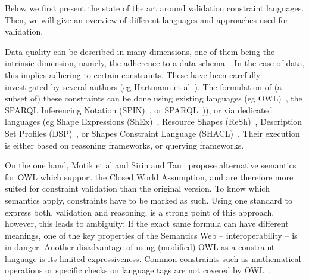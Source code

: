 Below
we first present the state of the art around validation constraint languages.
Then, we will give an overview
of different languages and approaches used for \rdf validation.


Data quality can be described in many dimensions,
one of them being the intrinsic dimension, namely,
the adherence to a data schema~\cite{zaveri2015quality}.
In the case of \rdf data, this implies adhering to certain constraints.
These have been carefully investigated by several authors (eg Hartmann et al~\cite{hartmann2016}).
The formulation of (a subset of) these constraints can be done using existing languages (eg OWL)~\cite{owl}, 
the SPARQL Inferencing Notation (SPIN)~\cite{Knublauch2011}, or SPARQL~\cite{sparql})),
or via dedicated languages
(eg Shape Expressions (ShEx)~\cite{shex}, Resource Shapes (ReSh)~\cite{resh}, Description Set Profiles (DSP)~\cite{dsp}, 
or Shapes Constraint Language (SHACL)~\cite{shacl}.
Their execution is either based on reasoning frameworks, or querying frameworks.

On the one hand, Motik et al \cite{motik2007adding} and Sirin and Tau~\cite{sirin2009towards}
propose alternative semantics for OWL
which support the Closed World Assumption,
and are therefore more suited for constraint validation than the original version.
To know which semantics apply,
constraints have to be marked as such.
Using one standard to express both, validation and reasoning,
is a strong point of this approach,
however,  this leads to ambiguity: %
%
If the exact same formula can have different meanings, one of the key properties of the Semantics Web -- interoperability -- is in danger.
Another disadvantage of using (modified) OWL as a constraint language
is its limited expressiveness. 
Common constraints such as mathematical operations
or specific checks on language tags
are not covered by OWL~\cite{hartmann2016}.

